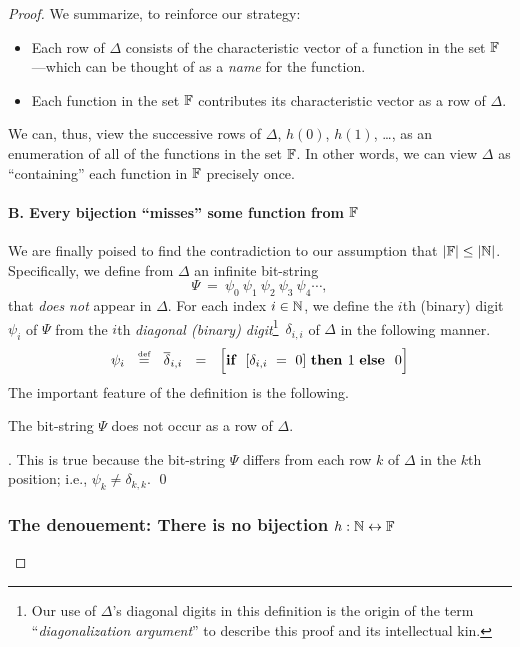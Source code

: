 \begin{proof}
\noindent We summarize, to reinforce our strategy:
\begin{itemize}
\item
Each row of $\Delta$ consists of the characteristic vector of a function in the set $\mathbb{F}$---which can be thought of as a {\em name} for the function.

\medskip\item
Each function in the set $\mathbb{F}$ contributes its characteristic vector as a row of $\Delta$.
\end{itemize}
We can, thus, view the successive rows of $\Delta$, $h(0)$, $h(1)$, \ldots, as an enumeration of all of the functions in the set $\mathbb{F}$.  In other words, we can view $\Delta$ as ``containing'' each function in $\mathbb{F}$ precisely once.

\paragraph{B. Every bijection ``misses'' some function from $\mathbb{F}$}

We are finally poised to find the contradiction to our assumption that $|\mathbb{F}| \leq |\mathbb{N}|$.  Specifically, we define from $\Delta$ an infinite bit-string
\[ \Psi \ = \ \psi_0 \ \psi_1 \ \psi_2 \ \psi_3 \ \psi_4 \cdots, \]
that {\em does not} appear in $\Delta$.  For each index $i \in \mathbb{N}$, we define the $i$th (binary) digit $\psi_i$ of $\Psi$ from the $i$th {\em diagonal (binary) digit}\footnote{Our use of $\Delta$'s diagonal digits in this definition is the origin of the term ``{\em diagonalization argument}'' to describe this proof and its intellectual kin.}~$\delta_{i,i}$ of $\Delta$ in the following manner.
\[ \psi_i \ \ \eqdef \ \ \overline{\delta}_{i,i} \ \ = \ \
\Big[\mbox{\bf if } \ [\delta_{i,i} \ = \ 0] \ \mbox{\bf then } 1 \ \mbox{\bf else } \ 0 \Big]
\]
The important feature of the definition is the following.

\begin{lemma}
\label{lem:PSI-notin-DELTA}
The bit-string $\Psi$ does not occur as a row of $\Delta$.
\end{lemma}

.
This is true because the bit-string $\Psi$ differs from each row $k$ of $\Delta$ in the $k$th position; i.e., $\psi_k \neq \delta_{k,k}$.  \qed

\subsubsection{The denouement: There is no bijection  $h: \mathbb{N} \leftrightarrow \mathbb{F}$}


\end{proof}
